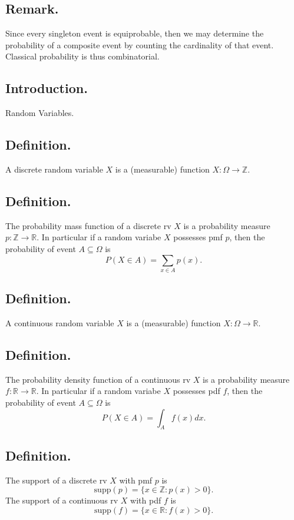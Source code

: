 \documentclass[titlepage]{article}
\begin{document}
\subsection{Remark.} Since every singleton event is equiprobable, then we may determine the probability of a composite event by counting the cardinality of that event. Classical probability is thus combinatorial.

\newpage {}

\subsection{Introduction.} Random Variables.

\subsection{Definition.} A discrete random variable $X$ is a (measurable) function $X: \Omega \to \mathbb{Z}.$

\subsection{Definition.} The probability mass function of a discrete rv $X$ is a probability measure $p: \mathbb{Z} \to \mathbb{R}$. In particular if a random variabe $X$ possesses pmf $p$, then the probability of event $A \subseteq \Omega$ is
$$P(X \in A) = \sum_{x \in A}p(x).$$

\subsection{Definition.} A continuous random variable $X$ is a (measurable) function $X: \Omega \to \mathbb{R}.$

\subsection{Definition.} The probability density function of a continuous rv $X$ is a probability measure $f: \mathbb{R} \to \mathbb{R}$. In particular if a random variabe $X$ possesses pdf $f$, then the probability of event $A \subseteq \Omega$ is 
$$P(X \in A) = \int_{A}f(x)dx.$$

\subsection{Definition.} The support of a discrete rv $X$ with pmf $p$ is  
$$\text{supp}(p) = \{x \in \mathbb{Z} : p(x) > 0\}.$$
The support of a continuous rv $X$ with pdf $f$ is
$$\text{supp}(f) = \{x \in \mathbb{R} : f(x) > 0\}.$$
\end{document}

